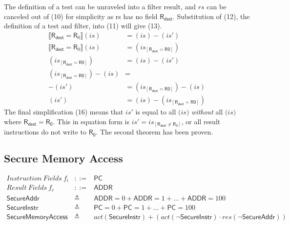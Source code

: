 \documentclass[12pt, letterpaper]{article}
\begin{document}
    The definition of a test can be unraveled into a filter result, and $\mathit{rs}$ can be canceled out of (10) for simplicity as rs has no field $\mathsf{R_{dest}}$.  Substitution of (12), the definition of a test and filter, into (11) will give (13).
\begin{align}
    \llbracket \mathsf{R}_{\mathsf{dest}} = \mathsf{R}_0 \rrbracket (\mathit{is})
    &=
    (\mathit{is}) - (\mathit{is}')
    \\
    \llbracket \mathsf{R}_{\mathsf{dest}} = \mathsf{R}_0 \rrbracket (\mathit{is})
    &=
    (\mathit{is_{[\mathsf{R_{dest}=R0}]}})
    \\
    (\mathit{is_{[\mathsf{R_{dest}=R0}]}})
    &=
    (\mathit{is}) - (\mathit{is}')
    \\
    (\mathit{is_{[\mathsf{R_{dest}=R0}]}}) - (\mathit{is}) 
    &=
    \\
    - (\mathit{is}')
    &=
    (\mathit{is_{[\mathsf{R_{dest}=R0}]}}) - (\mathit{is})
    \\
    (\mathit{is}')
    &=
    (\mathit{is}) - (\mathit{is_{[\mathsf{R_{dest}=R0}]}})
\end{align}
    The final simplification (16) means that $\mathit{is}'$ is equal to all $\mathit(is)$ \textit{without} all $\mathit(is)$ where $\mathsf{R_{dest}} = \mathsf{R_{0}}$.
    This in equation form is $\mathit{is}' = \mathit{is_{[\mathsf{R_{dest} \neq \mathsf{R_{0}}}]}}$, or all result instructions do not write to $\mathsf{R_{0}}$.  The second theorem has been proven.


\subsection{Secure Memory Access}
 \[
 \begin{array}{rcl}
   \mathit{Instruction\ Fields}\ f_i &::=& \mathsf{PC} \\
   \mathit{Result\ Fields}\ f_r &::=& \mathsf{ADDR} \\
   \mathsf{SecureAddr} &\triangleq& \mathsf{ADDR} = 0 + \mathsf{ADDR} = 1 + \ldots + \mathsf{ADDR} = 100 \\
   \mathsf{SecureInstr} &\triangleq& \mathsf{PC} = 0 + \mathsf{PC} = 1 + \ldots + \mathsf{PC} = 100 \\
   \mathsf{SecureMemoryAccess} &\triangleq&
     \mathit{act}(\mathsf{SecureInstr}) +
     (\mathit{act}(\neg\mathsf{SecureInstr}) \cdot
      \mathit{res}(\neg\mathsf{SecureAddr}))
      
 \end{array}
 \]
\end{document}
